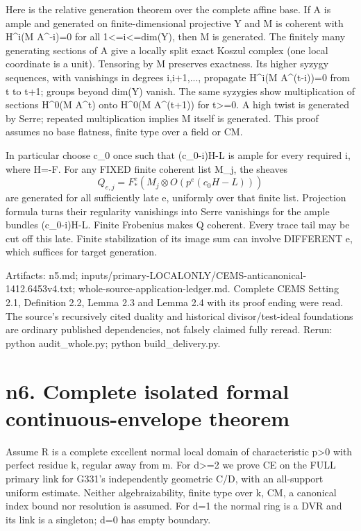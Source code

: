 \documentclass[11pt]{article}
\begin{document}
Here is the relative generation theorem over the complete affine base. If A is ample and generated on finite-dimensional projective Y and M is coherent with H\textasciicircum{}i(M A\textasciicircum{}-i)=0 for all 1<=i<=dim(Y), then M is generated. The finitely many generating sections of A give a locally split exact Koszul complex (one local coordinate is a unit). Tensoring by M preserves exactness. Its higher syzygy sequences, with vanishings in degrees i,i+1,..., propagate H\textasciicircum{}i(M A\textasciicircum{}(t-i))=0 from t to t+1; groups beyond dim(Y) vanish. The same syzygies show multiplication of sections H\textasciicircum{}0(M A\textasciicircum{}t) onto H\textasciicircum{}0(M A\textasciicircum{}(t+1)) for t>=0. A high twist is generated by Serre; repeated multiplication implies M itself is generated. This proof assumes no base flatness, finite type over a field or CM.

In particular choose c\_0 once such that (c\_0-i)H-L is ample for every required i, where H=-F. For any FIXED finite coherent list M\_j, the sheaves
\[
Q_{e,j}=F_*^e(M_j\otimes O(p^e(c_0H-L)))
\]
are generated for all sufficiently late e, uniformly over that finite list. Projection formula turns their regularity vanishings into Serre vanishings for the ample bundles (c\_0-i)H-L. Finite Frobenius makes Q coherent. Every trace tail may be cut off this late. Finite stabilization of its image sum can involve DIFFERENT e, which suffices for target generation.

Artifacts: n5.md; inputs/primary-LOCALONLY/CEMS-anticanonical-1412.6453v4.txt; whole-source-application-ledger.md. Complete CEMS Setting 2.1, Definition 2.2, Lemma 2.3 and Lemma 2.4 with its proof ending were read. The source's recursively cited duality and historical divisor/test-ideal foundations are ordinary published dependencies, not falsely claimed fully reread. Rerun: python audit\_whole.py; python build\_delivery.py.

\section{n6. Complete isolated formal continuous-envelope theorem}

Assume R is a complete excellent normal local domain of characteristic p>0 with perfect residue k, regular away from m. For d>=2 we prove CE on the FULL primary link for G331's independently geometric C/D, with an all-support uniform estimate. Neither algebraizability, finite type over k, CM, a canonical index bound nor resolution is assumed. For d=1 the normal ring is a DVR and its link is a singleton; d=0 has empty boundary.
\end{document}
